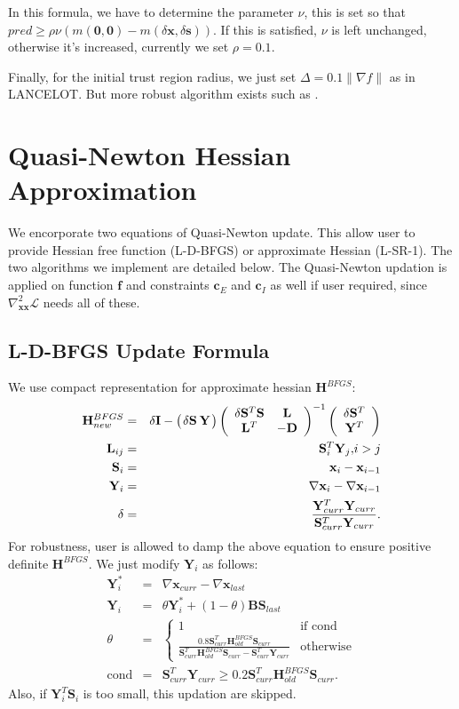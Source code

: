 \documentclass[annual]{acmsiggraph}
\newcommand{\E}[1]{\mathbf{#1}}
\newcommand{\TWOC}[2]{\left(\begin{array}{c}#1 \\ #2\end{array}\right)}
\newcommand{\TWOR}[2]{\left(\setlength{\arraycolsep}{1pt}\begin{array}{cc}{#1} & {#2}\end{array}\right)}
\newcommand{\TWORC}[4]{\left(\begin{array}{cc}#1 & #2 \\ #3 & #4\end{array}\right)}
\begin{document}
In this formula, we have to determine the parameter $\nu$, this is set so that $pred \geq \rho\nu(m(\E{0},\E{0})-m(\delta\E{x},\delta\E{s}))$. If this is satisfied, $\nu$ is left unchanged, otherwise it's increased, currently we set $\rho=0.1$.

Finally, for the initial trust region radius, we just set $\Delta=0.1\|\nabla f\|$ as in LANCELOT. But more robust algorithm exists such as \cite{sartenaer1997automatic}.

\section{Quasi-Newton Hessian Approximation}
We encorporate two equations of Quasi-Newton update. This allow user to provide Hessian free function (L-D-BFGS) or approximate Hessian (L-SR-1). The two algorithms we implement are detailed below. The Quasi-Newton updation is applied on function $\E{f}$ and constraints $\E{c}_E$ and $\E{c}_I$ as well if user required, since $\nabla^2_{\E{x}\E{x}}\mathcal{L}$ needs all of these.

\subsection{L-D-BFGS Update Formula}
We use compact representation for approximate hessian $\E{H}^{BFGS}$:
\begin{eqnarray*}
\E{H}^{BFGS}_{new}&=&\delta\E{I}-\TWOR{\delta\E{S}}{\E{Y}}\TWORC{\delta\E{S}^T\E{S}}{\E{L}}{\E{L}^T}{-\E{D}}^{-1}\TWOC{\delta\E{S}^T}{\E{Y}^T}	\\
\E{L}_{ij}&=&\E{S}_i^T\E{Y}_j\E{ , }i>j	\\
\E{S}_i&=&\E{x}_i-\E{x}_{i-1}	\\
\E{Y}_i&=&\nabla\E{x}_i-\nabla\E{x}_{i-1}	\\
\delta&=&\frac{\E{Y}_{curr}^T\E{Y}_{curr}}{\E{S}_{curr}^T\E{Y}_{curr}}.
\end{eqnarray*}
For robustness, user is allowed to damp the above equation to ensure positive definite $\E{H}^{BFGS}$. We just modify $\E{Y}_i$ as follows:
\begin{eqnarray*}
\E{Y}_i^*&=&\nabla\E{x}_{curr}-\nabla\E{x}_{last}	\\
\E{Y}_i&=&\theta\E{Y}_i^*+(1-\theta)\E{B}\E{S}_{last}	\\
\theta&=&
\begin{cases}
   1 & \text{if cond}	\\
   \frac{0.8\E{S}_{curr}^T\E{H}^{BFGS}_{old}\E{S}_{curr}}{\E{S}_{curr}^T\E{H}^{BFGS}_{old}\E{S}_{curr}-\E{S}_{curr}^T\E{Y}_{curr}} & \text{otherwise}
\end{cases}	\\
\text{cond}&=&\E{S}_{curr}^T\E{Y}_{curr} \geq 0.2\E{S}_{curr}^T\E{H}^{BFGS}_{old}\E{S}_{curr}.
\end{eqnarray*}
Also, if $\E{Y}_i^T\E{S}_i$ is too small, this updation are skipped.
\end{document}
